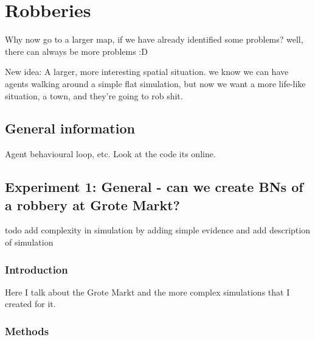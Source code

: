  

\chapter[Robberies in ``real'' locations]{Robberies}


Why now go to a larger map, if we have already identified some problems? well, there can always be more problems :D 


New idea: A  larger, more interesting spatial situation. we know we can have agents walking around a simple flat simulation, but now we want a more life-like situation, a town, and they're going to rob shit.


\section{General information}


Agent behavioural loop, etc. Look at the code its online.


\section{Experiment 1: General - can we create BNs of a robbery at Grote Markt?}

{\color{red} todo add complexity in simulation by adding simple evidence and add description of simulation}


\subsection{Introduction}
Here I talk about the Grote Markt and the more complex simulations that I created for it.

\subsection{Methods}

